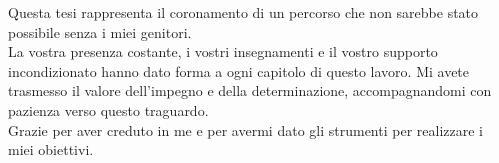 
%

\begin{ntdedicatory}

    Questa tesi rappresenta il coronamento di un percorso che non sarebbe stato possibile senza i miei genitori. \\ La vostra presenza costante, i vostri insegnamenti e il vostro supporto incondizionato hanno dato forma a ogni capitolo di questo lavoro. Mi avete trasmesso il valore dell'impegno e della determinazione, accompagnandomi con pazienza verso questo traguardo. \\ Grazie per aver creduto in me e per avermi dato gli strumenti per realizzare i miei obiettivi.
\end{ntdedicatory}
